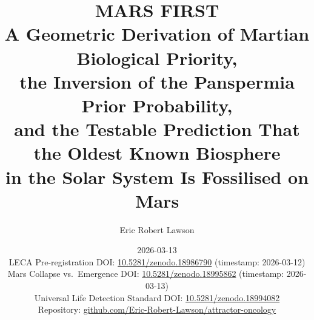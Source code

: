 \documentclass[11pt, a4paper]{article}
\begin{document}
\title{
  \large\bfseries\color{headerblue}
  MARS FIRST\\[0.4em]
  \normalsize\color{headerblue}
  A Geometric Derivation of Martian Biological
  Priority,\\
  the Inversion of the Panspermia Prior
  Probability,\\
  and the Testable Prediction That the Oldest
  Known Biosphere\\
  in the Solar System Is Fossilised on Mars
}

\author[1]{Eric Robert Lawson}

\date{2026-03-13\\[0.3em]
  \footnotesize
  LECA Pre-registration DOI:
  \href{https://doi.org/10.5281/zenodo.18986790}
  {10.5281/zenodo.18986790}
  (timestamp: 2026-03-12)\\
  Mars Collapse vs.\ Emergence DOI:
  \href{https://doi.org/10.5281/zenodo.18995862}
  {10.5281/zenodo.18995862}
  (timestamp: 2026-03-13)\\
  Universal Life Detection Standard DOI:
  \href{https://doi.org/10.5281/zenodo.18994082}
  {10.5281/zenodo.18994082}\\
  Repository:
  \href{https://github.com/Eric-Robert-Lawson/attractor-oncology}
  {github.com/Eric-Robert-Lawson/attractor-oncology}
}

\maketitle
\thispagestyle{empty}
\end{document}
